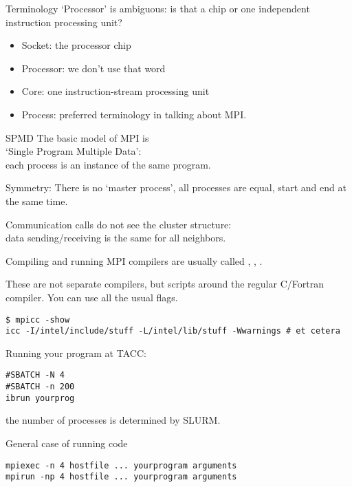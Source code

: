 \begin{numberedframe}{Terminology}
  `Processor' is ambiguous: is that a chip or one independent
  instruction processing unit?
  \begin{itemize}
  \item Socket: the processor chip
  \item Processor: we don't use that word
  \item Core: one instruction-stream processing unit
  \item Process: preferred terminology in talking about MPI.
  \end{itemize}  
\end{numberedframe}

\begin{numberedframe}{SPMD}
  The basic model of MPI is\\
  `Single Program Multiple Data':\\
  each process is an instance of the same program.

  Symmetry: There is no `master process', all processes are equal,
  start and end
  at the same time.

  Communication calls do not see the cluster structure:\\
  data sending/receiving is the same for all neighbors.
\end{numberedframe}


\begin{numberedframe}{Compiling and running}
  MPI compilers are usually called ,
  , .

  These are not separate compilers,
  but scripts around the regular C/Fortran compiler. You can use all
  the usual flags.
\begin{verbatim}
$ mpicc -show
icc -I/intel/include/stuff -L/intel/lib/stuff -Wwarnings # et cetera
\end{verbatim}

\begin{tacc}
  Running your program at TACC:
\begin{verbatim}
#SBATCH -N 4
#SBATCH -n 200
ibrun yourprog
\end{verbatim}
  the number of processes is determined by SLURM.
\end{tacc}
General case of running code
\begin{verbatim}
mpiexec -n 4 hostfile ... yourprogram arguments
mpirun -np 4 hostfile ... yourprogram arguments
\end{verbatim}
\end{numberedframe}

